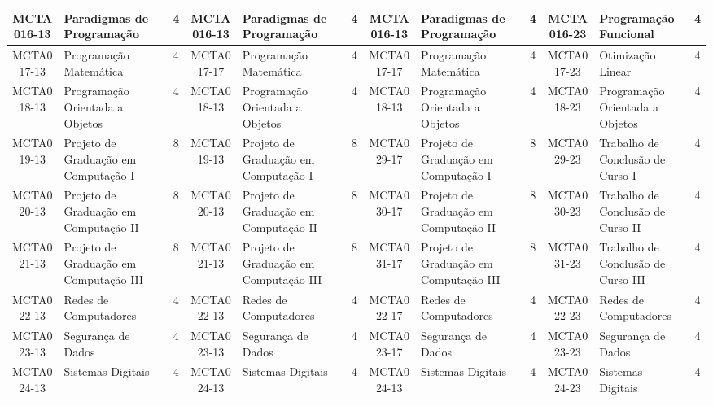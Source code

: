 \begin{landscape}
{\begin{longtable}{|c|p{.2\textheight}|c||c|p{.2\textheight}|c||c|p{.2\textheight}|c||c|p{.2\textheight}|c|}
    MCTA016-13 & Paradigmas de Programação & 4 &
    MCTA016-13 & Paradigmas de Programação & 4 & 
    MCTA016-13 & Paradigmas de Programação & 4 &
    MCTA016-23 & Programação Funcional & 4 \\ \hline

    MCTA017-13 & Programação Matemática & 4 &
    MCTA017-17 & Programação Matemática & 4 &
    MCTA017-17 & Programação Matemática & 4 &
    MCTA017-23 & Otimização Linear & 4 \\ \hline

    MCTA018-13 & Programação Orientada a Objetos & 4 &
    MCTA018-13 & Programação Orientada a Objetos & 4 & 
    MCTA018-13 & Programação Orientada a Objetos & 4 &
    MCTA018-23 & Programação Orientada a Objetos & 4 \\ \hline

    MCTA019-13 & Projeto de Graduação em Computação I & 8 &
    MCTA019-13 & Projeto de Graduação em Computação I & 8 &
    MCTA029-17 & Projeto de Graduação em Computação I & 8 &
    MCTA029-23 & Trabalho de Conclusão de Curso I & 4 \\ \hline

    MCTA020-13 & Projeto de Graduação em Computação II & 8 &
    MCTA020-13 & Projeto de Graduação em Computação II & 8 &
    MCTA030-17 & Projeto de Graduação em Computação II & 8 & 
    MCTA030-23 & Trabalho de Conclusão de Curso II & 4 \\ \hline

    MCTA021-13 & Projeto de Graduação em Computação III & 8 &
    MCTA021-13 & Projeto de Graduação em Computação III & 8 & 
    MCTA031-17 & Projeto de Graduação em Computação III & 8 &
    MCTA031-23 & Trabalho de Conclusão de Curso III & 4 \\ \hline

    MCTA022-13 & Redes de Computadores & 4 & 
    MCTA022-13 & Redes de Computadores & 4 &
    MCTA022-17 & Redes de Computadores & 4 & 
    MCTA022-23 & Redes de Computadores & 4 \\ \hline

    MCTA023-13 & Segurança de Dados & 4 & 
    MCTA023-13 & Segurança de Dados & 4 & 
    MCTA023-17 & Segurança de Dados & 4 & 
    MCTA023-23 & Segurança de Dados & 4 \\ \hline

    MCTA024-13 & Sistemas Digitais & 4 &
    MCTA024-13 & Sistemas Digitais & 4 &
    MCTA024-13 & Sistemas Digitais & 4 &
    MCTA024-23 & Sistemas Digitais & 4 \\ \hline


\end{longtable}}
\end{landscape}
